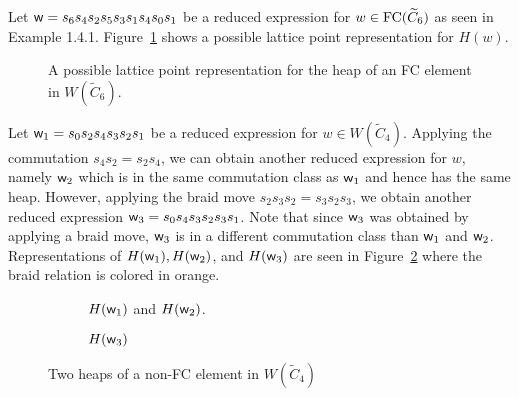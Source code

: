 \begin{example}
	Let $\mathsf{w}=s_6s_4s_2s_5s_3s_1s_4s_0s_1$ be a reduced expression for $w \in \mathrm{FC}(\widetilde{C}_6)$ as seen in Example 1.4.1. Figure~\ref{fig:FC heap} shows a possible lattice point representation for $H(w)$.
\begin{figure}[h]
\centering
{}
\caption{A possible lattice point representation for the heap of an FC element in $W(\widetilde{C}_6)$.}
\label{fig:FC heap}
\end{figure}
\end{example}

\begin{example}
Let $\mathsf{w}_1=s_0s_2s_4s_3s_2s_1$ be a reduced expression for $w \in W(\widetilde{C}_4)$. Applying the commutation $s_4s_2=s_2s_4$, we can obtain another reduced expression for $w$, namely $\mathsf{w}_2$ which is in the same commutation class as $\mathsf{w}_1$ and hence has the same heap. However, applying the braid move $s_2s_3s_2=s_3s_2s_3$, we obtain another reduced expression $\mathsf{w}_3=s_0s_4s_3s_2s_3s_1$. Note that since $\mathsf{w}_3$ was obtained by applying a braid move, $\mathsf{w}_3$ is in a different commutation class than $\mathsf{w}_1$ and $\mathsf{w}_2$. Representations of $H(\mathsf{w}_1), H(\mathsf{w}_2)$, and $H(\mathsf{w}_3)$ are seen in Figure~\ref{fig:not FC} where the braid relation is colored in orange.

\begin{figure}[h]
\centering
\begin{subfigure}[b]{0.3\textwidth}	
\centering
{}
\caption{$H(\mathsf{w}_1)$ and $H(\mathsf{w}_2)$.}
\end{subfigure}
\begin{subfigure}[b]{0.3\textwidth}	
\centering
{}
\caption{$H(\mathsf{w}_3)$}
\end{subfigure}
\caption{Two heaps of a non-FC element in $W(\widetilde{C}_4)$}	
\label{fig:not FC}
\end{figure}
\end{example}

